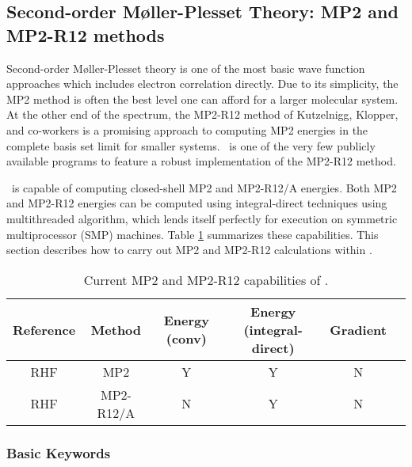 \subsection{Second-order M\o ller-Plesset Theory: MP2 and MP2-R12 methods} \label{cc}

Second-order M\o ller-Plesset theory is one of the most basic wave
function approaches which includes electron correlation
directly.
Due to its simplicity, the MP2 method is often the best
level one can afford for a larger molecular system.
At the other end of the spectrum, the MP2-R12 method
of Kutzelnigg, Klopper, and co-workers is a promising
approach to computing MP2 energies in the complete
basis set limit for smaller systems. \PSIthree\ is
one of the very few publicly available programs to
feature a robust implementation of the MP2-R12 method.


\PSIthree\ is capable of computing closed-shell
MP2 and MP2-R12/A energies. Both MP2 and MP2-R12 energies can be computed
using integral-direct techniques using multithreaded algorithm,
which lends itself perfectly for execution on symmetric multiprocessor (SMP)
machines.
Table \ref{table:mp2summary} summarizes these capabilities.  This section
describes how to carry out MP2 and MP2-R12 calculations within \PSIthree.
\begin{table}[h]
\begin{center}
\begin{tabular}{cccccc}
\hline
\hline
Reference & Method & Energy (conv) & Energy (integral-direct) & Gradient  \\
\hline
RHF       & MP2    & Y & Y & N \\
RHF       & MP2-R12/A & N & Y & N \\
\hline
\hline
\end{tabular}
\end{center}
\caption{Current MP2 and MP2-R12 capabilities of \PSIthree.}
\label{table:mp2summary}
\end{table}

\subsubsection{Basic Keywords}

